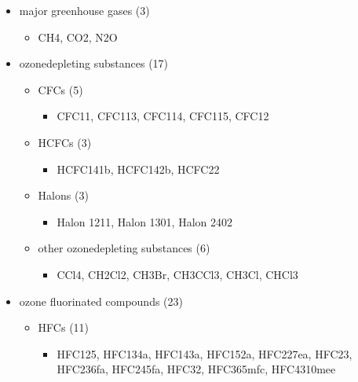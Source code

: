\documentclass[letterpaper,10pt,english]{jupyterBook}
\begin{document}
\begin{itemize}
\item {}
\sphinxAtStartPar
major greenhouse gases (3)
\begin{itemize}
\item {}
\sphinxAtStartPar
CH4, CO2, N2O

\end{itemize}

\item {}
\sphinxAtStartPar
ozone\sphinxhyphen{}depleting substances (17)
\begin{itemize}
\item {}
\sphinxAtStartPar
CFCs (5)
\begin{itemize}
\item {}
\sphinxAtStartPar
CFC\sphinxhyphen{}11, CFC\sphinxhyphen{}113, CFC\sphinxhyphen{}114, CFC\sphinxhyphen{}115, CFC\sphinxhyphen{}12

\end{itemize}

\item {}
\sphinxAtStartPar
HCFCs (3)
\begin{itemize}
\item {}
\sphinxAtStartPar
HCFC\sphinxhyphen{}141b, HCFC\sphinxhyphen{}142b, HCFC\sphinxhyphen{}22

\end{itemize}

\item {}
\sphinxAtStartPar
Halons (3)
\begin{itemize}
\item {}
\sphinxAtStartPar
Halon 1211, Halon 1301, Halon 2402

\end{itemize}

\item {}
\sphinxAtStartPar
other ozone\sphinxhyphen{}depleting substances (6)
\begin{itemize}
\item {}
\sphinxAtStartPar
CCl4, CH2Cl2, CH3Br,
CH3CCl3, CH3Cl, CHCl3

\end{itemize}

\end{itemize}

\item {}
\sphinxAtStartPar
ozone fluorinated compounds (23)
\begin{itemize}
\item {}
\sphinxAtStartPar
HFCs (11)
\begin{itemize}
\item {}
\sphinxAtStartPar
HFC\sphinxhyphen{}125, HFC\sphinxhyphen{}134a, HFC\sphinxhyphen{}143a, HFC\sphinxhyphen{}152a, HFC\sphinxhyphen{}227ea, HFC\sphinxhyphen{}23, HFC\sphinxhyphen{}236fa,
HFC\sphinxhyphen{}245fa, HFC\sphinxhyphen{}32, HFC\sphinxhyphen{}365mfc, HFC\sphinxhyphen{}4310mee


\end{itemize}
\end{itemize}
\end{itemize}
\end{document}
